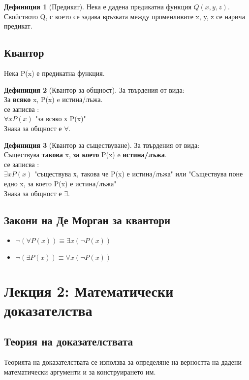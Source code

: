 \documentclass[fleqn, 12pt]{article}
\theoremstyle{definition}
\newtheorem{definition}{Дефиниция}[subsection]
\begin{document}
\begin{definition}[Предикат]
Нека е дадена предикатна функция $Q(x,y,z)$.\\
Свойството Q, с което се задава връзката между променливите x, y, z се нарича предикат.
\end{definition}

\subsection{Квантор}
Нека P(x) е предикатна функция.

\begin{definition}[Квантор за общност]
За твърдения от вида: \\
За \textbf{всяко} x, P(x) e истина/лъжа.\\
се записва : \\
$\forall x P(x)$ "за всяко х P(x)"\\
Знака за общност е $\forall$.
\end{definition}

\begin{definition}[Квантор за съществуване]
За твърдения от вида: \\
Съществува \textbf{такова} x, \textbf{за което} P(x) e \textbf{истина/лъжа}.\\
се записва : \\
$\exists x P(x)$ "съществува х, такова че P(x) е истина/лъжа" или "Съществува поне едно x, за което P(x) е истина/лъжа"\\
Знака за общност е $\exists$.
\end{definition}

\subsection{Закони на Де Морган за квантори}

\begin{itemize}
	\item $\neg (\forall P(x)) \equiv \exists x(\neg P(x))$
	\item $\neg (\exists P(x)) \equiv \forall x(\neg P(x))$
\end{itemize}

\newpage

\section{Лекция 2: Математически доказателства}

\subsection{Теория на доказателствата}
Теорията на доказателствата се използва за определяне на верността на дадени математически аргументи и за конструирането им. 
\end{document}
